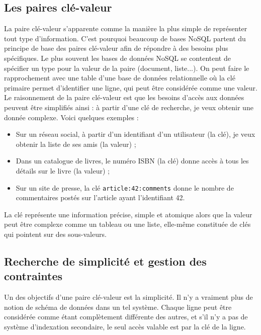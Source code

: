 \subsection{Les paires clé-valeur}
	La paire clé-valeur s'apparente comme la manière la plus simple de représenter tout type d'information. C'est pourquoi beaucoup de bases NoSQL partent du principe de base des paires clé-valeur afin de répondre à des besoins plus spécifiques. Le plus souvent  les bases de données NoSQL se contentent de spécifier un type pour la valeur de la paire (document, liste...). On peut faire le rapprochement avec une table d'une base de données relationnelle où la clé primaire permet d'identifier une ligne, qui peut être considérée comme une valeur.\\

	Le raisonnement de la paire clé-valeur est que les besoins d'accès aux données peuvent être simplifiés ainsi : à partir d'une clé de recherche, je veux obtenir une donnée complexe. Voici quelques exemples :
	\begin{itemize}
		\item Sur un réseau social, à partir d'un identifiant d'un utilisateur (la clé), je veux obtenir la liste de ses amis (la valeur) ;
		\item Dans un catalogue de livres, le numéro ISBN (la clé) donne accès à tous les détails sur le livre (la valeur) ;
		\item Sur un site de presse, la clé \texttt{article:42:comments} donne le nombre de commentaires postés sur l'article ayant l'identifiant 42.
	\end{itemize}
	\vspace{20px}

	La clé représente une information précise, simple et atomique alors que la valeur peut être complexe comme un tableau ou une liste, elle-même constituée de clés qui pointent sur des sous-valeurs.

\subsection{Recherche de simplicité et gestion des contraintes}
	Un des objectifs d'une paire clé-valeur est la simplicité. Il n'y a vraiment plus de notion de schéma de données dans un tel système. Chaque ligne peut être considérée comme étant complètement différente des autres, et s'il n'y a pas de système d'indexation secondaire, le seul accès valable est par la clé de la ligne.\\

